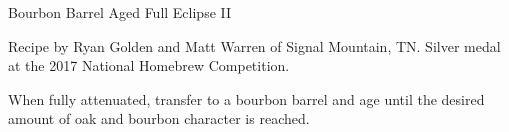 \stylesection{\styleimperialstout}

\begin{recipe}{Bourbon Barrel Aged Full Eclipse II} %

\begin{aboutblock}
Recipe by Ryan Golden and Matt Warren of Signal Mountain, TN. Silver medal
at the 2017 National Homebrew Competition. \sourceaha
\end{aboutblock}


\begin{methodandtiming}
 
\begin{mashsteps}
\end{mashsteps}

\begin{fermentationsteps}
\end{fermentationsteps}

\begin{directions}
When fully attenuated, transfer to a bourbon barrel and age until the desired
amount of oak and bourbon character is reached.
\end{directions}

\end{methodandtiming}

\recipebreak

\begin{ingredientsblock}

\begin{malts}
\end{malts}

\begin{hops}

\end{hops}


\end{ingredientsblock}

\end{recipe}

